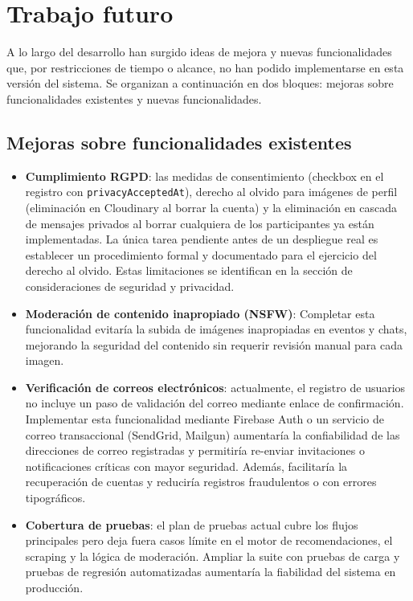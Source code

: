 \section{Trabajo futuro}

A lo largo del desarrollo han surgido ideas de mejora y nuevas funcionalidades que, por restricciones de tiempo o alcance, no han podido implementarse en esta versión del sistema. Se organizan a continuación en dos bloques: mejoras sobre funcionalidades existentes y nuevas funcionalidades.

\subsection{Mejoras sobre funcionalidades existentes}

\begin{itemize}
    \item \textbf{Cumplimiento RGPD}: las medidas de consentimiento (checkbox en el registro con \texttt{privacyAcceptedAt}), derecho al olvido para imágenes de perfil (eliminación en Cloudinary al borrar la cuenta) y la eliminación en cascada de mensajes privados al borrar cualquiera de los participantes ya están implementadas. La única tarea pendiente antes de un despliegue real es establecer un procedimiento formal y documentado para el ejercicio del derecho al olvido. Estas limitaciones se identifican en la sección de consideraciones de seguridad y privacidad.

    \item \textbf{Moderación de contenido inapropiado (NSFW)}: Completar esta funcionalidad evitaría la subida de imágenes inapropiadas en eventos y chats, mejorando la seguridad del contenido sin requerir revisión manual para cada imagen.

    \item \textbf{Verificación de correos electrónicos}: actualmente, el registro de usuarios no incluye un paso de validación del correo mediante enlace de confirmación. Implementar esta funcionalidad mediante Firebase Auth o un servicio de correo transaccional (SendGrid, Mailgun) aumentaría la confiabilidad de las direcciones de correo registradas y permitiría re-enviar invitaciones o notificaciones críticas con mayor seguridad. Además, facilitaría la recuperación de cuentas y reduciría registros fraudulentos o con errores tipográficos.

    \item \textbf{Cobertura de pruebas}: el plan de pruebas actual cubre los flujos principales pero deja fuera casos límite en el motor de recomendaciones, el scraping y la lógica de moderación. Ampliar la suite con pruebas de carga y pruebas de regresión automatizadas aumentaría la fiabilidad del sistema en producción.
\end{itemize}

